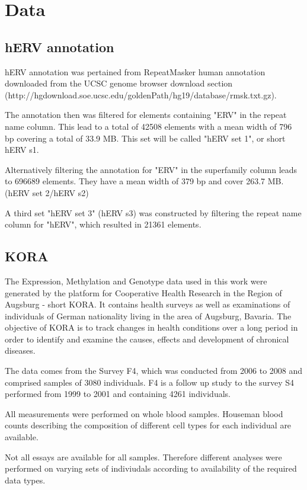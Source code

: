 \documentclass[a4paper,12pt]{article}
\begin{document}
\newpage
\section{Data}


\subsection{hERV annotation}
hERV annotation was pertained from RepeatMasker human annotation downloaded from the UCSC genome browser download section \\(http://hgdownload.soe.ucsc.edu/goldenPath/hg19/database/rmsk.txt.gz).
 
The annotation then was filtered for elements containing "ERV" in the repeat name column. This lead to a total of 42508 elements with a mean width of 796 bp covering a total of 33.9 MB. This set will be called "hERV set 1", or short hERV s1.

Alternatively filtering the annotation for "ERV" in the superfamily column leads to 696689 elements. They have a mean width of 379 bp and cover 263.7 MB. (hERV set 2/hERV s2)

A third set "hERV set 3" (hERV s3) was constructed by filtering the repeat name column for "hERV", which resulted in 21361 elements. 

\subsection{KORA}
The Expression, Methylation and Genotype data used in this work were generated by the platform for Cooperative Health Research in the Region of Augsburg - short KORA. It contains health surveys as well as examinations of individuals of German nationality living in the area of Augsburg, Bavaria.
The objective of KORA is to track changes in health conditions over a long period in order to identify and examine the causes, effects and development of chronical diseases.

The data comes from the Survey F4, which was conducted from 2006 to 2008 and comprised samples of 3080 individuals. F4 is a follow up study to the survey S4 performed from 1999 to 2001 and containing 4261 individuals. 

All measurements were performed on whole blood samples. Houseman blood counts describing the composition of different cell types for each individual are available.

Not all essays are available for all samples. Therefore different analyses were performed on varying sets of indiviudals according to availability of the required data types.
\end{document}
